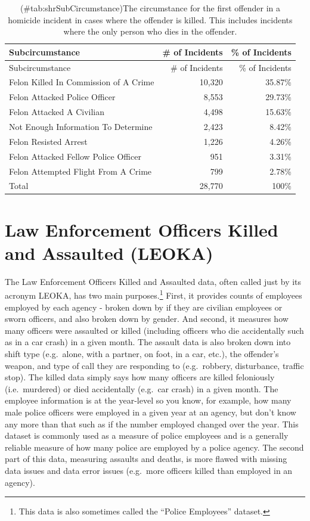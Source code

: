 \documentclass[
  12pt,
  openany]{book}
\begin{document}
\begin{longtable}[]{@{}lrr@{}}
\caption{(\#tab:shrSubCircumstance)The circumstance for the first offender in a homicide incident in cases where the offender is killed. This includes incidents where the only person who dies in the offender.}\tabularnewline
\toprule
Subcircumstance & \# of Incidents & \% of Incidents\tabularnewline
\midrule
\endfirsthead
\toprule
Subcircumstance & \# of Incidents & \% of Incidents\tabularnewline
\midrule
\endhead
Felon Killed In Commission of A Crime & 10,320 & 35.87\%\tabularnewline
Felon Attacked Police Officer & 8,553 & 29.73\%\tabularnewline
Felon Attacked A Civilian & 4,498 & 15.63\%\tabularnewline
Not Enough Information To Determine & 2,423 & 8.42\%\tabularnewline
Felon Resisted Arrest & 1,226 & 4.26\%\tabularnewline
Felon Attacked Fellow Police Officer & 951 & 3.31\%\tabularnewline
Felon Attempted Flight From A Crime & 799 & 2.78\%\tabularnewline
Total & 28,770 & 100\%\tabularnewline
\bottomrule
\end{longtable}

\hypertarget{leoka}{%
\chapter{Law Enforcement Officers Killed and Assaulted (LEOKA)}\label{leoka}}

The Law Enforcement Officers Killed and Assaulted data, often called just by its acronym LEOKA, has two main purposes.\footnote{This data is also sometimes called the ``Police Employees'' dataset.} First, it provides counts of employees employed by each agency - broken down by if they are civilian employees or sworn officers, and also broken down by gender. And second, it measures how many officers were assaulted or killed (including officers who die accidentally such as in a car crash) in a given month. The assault data is also broken down into shift type (e.g.~alone, with a partner, on foot, in a car, etc.), the offender's weapon, and type of call they are responding to (e.g.~robbery, disturbance, traffic stop). The killed data simply says how many officers are killed feloniously (i.e.~murdered) or died accidentally (e.g.~car crash) in a given month. The employee information is at the year-level so you know, for example, how many male police officers were employed in a given year at an agency, but don't know any more than that such as if the number employed changed over the year. This dataset is commonly used as a measure of police employees and is a generally reliable measure of how many police are employed by a police agency. The second part of this data, measuring assaults and deaths, is more flawed with missing data issues and data error issues (e.g.~more officers killed than employed in an agency).
\end{document}

